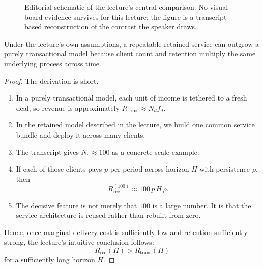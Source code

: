 \begin{figure}[h]
\centering
{}
\caption{Editorial schematic of the lecture's central comparison. No visual board evidence survives for this lecture; the figure is a transcript-based reconstruction of the contrast the speaker draws.}
\end{figure}

\begin{proposition}
Under the lecture's own assumptions, a repeatable retained service can outgrow a purely transactional model because client count and retention multiply the same underlying process across time.
\end{proposition}

\begin{proof}
The derivation is short.
\begin{enumerate}
\item In a purely transactional model, each unit of income is tethered to a fresh deal, so revenue is approximately \(R_{\text{trans}} \approx N_d f_d\).
\item In the retained model described in the lecture, we build one common service bundle and deploy it across many clients.
\item The transcript gives \(N_c \approx 100\) as a concrete scale example.
\item If each of those clients pays \(p\) per period across horizon \(H\) with persistence \(\rho\), then
\[
R_{\text{rec}}^{(100)} \approx 100\,p\,H\,\rho.
\]
\item The decisive feature is not merely that \(100\) is a large number. It is that the service architecture is reused rather than rebuilt from zero.
\end{enumerate}
Hence, once marginal delivery cost is sufficiently low and retention sufficiently strong, the lecture's intuitive conclusion follows:
\begin{equation}
R_{\text{rec}}(H) > R_{\text{trans}}(H)
\end{equation}
for a sufficiently long horizon \(H\).
\end{proof}

